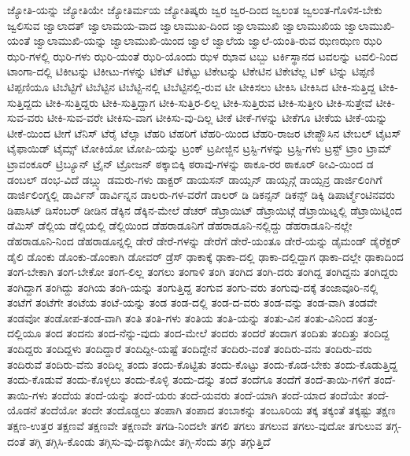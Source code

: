 {ಜ್ಯೋತಿ-ಯನ್ನು
ಜ್ಯೋತಿಯೇ
ಜ್ಯೋತಿರ್ಮಯ
ಜ್ಯೋತಿಷ್ಕರು
ಜ್ವರ
ಜ್ವರ-ದಿಂದ
ಜ್ವಲಂತ
ಜ್ವಲಂತ-ಗೊಳಿಸ-ಬೇಕು
ಜ್ವಲಿಸುವ
ಜ್ವಾಲಾದತ್
ಜ್ವಾಲಾಮಯ-ವಾದ
ಜ್ವಾಲಾಮುಖ-ದಿಂದ
ಜ್ವಾಲಾಮುಖಿ
ಜ್ವಾಲಾಮುಖಿಯ
ಜ್ವಾಲಾಮುಖಿ-ಯಂತೆ
ಜ್ವಾಲಾಮುಖಿ-ಯನ್ನು
ಜ್ವಾಲಾಮುಖಿ-ಯಿಂದ
ಜ್ವಾಲೆ
ಜ್ವಾಲೆಯ
ಜ್ವಾಲೆ-ಯಂತಿ-ರುವ
ಝಣಝಣ
ಝರಿ
ಝರಿ-ಗಳಲ್ಲಿ
ಝರಿ-ಗಳು
ಝರಿ-ಯಂತೆ
ಝರಿ-ಯೊಂದು
ಝಳ
ಝಾವ
ಟಬ್ಬು
ಟರ್ಕಿಸ್ಥಾನದ
ಟವಲನ್ನು
ಟವಲಿ-ನಿಂದ
ಟಾಂಗಾ-ದಲ್ಲಿ
ಟಿಕೀಟನ್ನು
ಟಿಕೀಟು-ಗಳನ್ನು
ಟಿಕೆಟ್
ಟಿಕೆಟ್ಟು
ಟಿಕೇಟನ್ನು
ಟಿಕೇಟಿನ
ಟಿಕೇಟೆಲ್ಲ
ಟಿಕ್
ಟಿನ್ನು
ಟಿಪ್ಪಣಿ
ಟಿಪ್ಪಣಿಯೂ
ಟಿಬೆಟ್ಟಿಗೆ
ಟಿಬೆಟ್ಟಿನ
ಟಿಬೆಟ್ಟಿ-ನಲ್ಲಿ
ಟಿಬೆಟ್ಟಿನಲ್ಲಿ-ರುವ
ಟೀ
ಟೀಕಿಸಲು
ಟೀಕಿಸಿ
ಟೀಕಿಸಿದ
ಟೀಕಿ-ಸುತ್ತಿದ್ದ
ಟೀಕಿ-ಸುತ್ತಿದ್ದದು
ಟೀಕಿ-ಸುತ್ತಿದ್ದರು
ಟೀಕಿ-ಸುತ್ತಿದ್ದಾಗ
ಟೀಕಿ-ಸುತ್ತಿರ-ಲಿಲ್ಲ
ಟೀಕಿ-ಸುತ್ತಿರುವ
ಟೀಕಿ-ಸುತ್ತೀರಿ
ಟೀಕಿ-ಸುತ್ತೇವೆ
ಟೀಕಿ-ಸುವ-ವರು
ಟೀಕಿ-ಸುವ-ವರೇ
ಟೀಕಿಸು-ವಾಗ
ಟೀಕಿಸು-ವು-ದಿಲ್ಲ
ಟೀಕೆ
ಟೀಕೆ-ಗಳನ್ನು
ಟೀಕೆಗೂ
ಟೀಕೆಯ
ಟೀಕೆ-ಯನ್ನು
ಟೀಕೆ-ಯಿಂದ
ಟೀಗೆ
ಟೆನಿಸ್
ಟೆರೈ
ಟೆಲ್ಸಾ
ಟೆಹರಿ
ಟೆಹರಿಗೆ
ಟೆಹರಿ-ಯಿಂದ
ಟೆಹರಿ-ರಾಜರ
ಟೇಪ್ಹೌಸಿನ
ಟೇಬಲ್
ಟೈಟಸ್
ಟೈಫಾಯಿಡ್
ಟೈಮ್ಸ್
ಟೋಕಿಯೋ
ಟೋಪಿ-ಯನ್ನು
ಟ್ರಂಕ್
ಟ್ರಪೀಜ್ಜಿನ
ಟ್ರಸ್ಟಿ-ಗಳನ್ನು
ಟ್ರಸ್ಟಿ-ಗಳು
ಟ್ರಸ್ಟ್
ಟ್ರಾಂ
ಟ್ರಾಮ್
ಟ್ರಾವಂಕೂರ್
ಟ್ರಿಬ್ಯೂನ್
ಟ್ರೈನ್
ಟ್ರೋಜನ್
ಠಕ್ಕಾಬಿಕ್ಕಿ
ಠರಾವು-ಗಳನ್ನು
ಠಾಕೂ-ರರ
ಠಾಕೂರ್
ಠೀವಿ-ಯಿಂದ
ಡ
ಡಂಬಲ್
ಡಂಭ-ವಿದೆ
ಡಬ್ಲ್ಯು
ಡಮರು-ಗಳು
ಡಾಕ್ಟರ್
ಡಾಯಸನ್
ಡಾಯ್ಸನ್
ಡಾಯ್ಸನ್ಗೆ
ಡಾಯ್ಸನ್ರ
ಡಾರ್ಜಿಲಿಂಗಿಗೆ
ಡಾರ್ಜಿಲಿಂಗ್ನಲ್ಲಿ
ಡಾರ್ವಿನ್
ಡಾರ್ವಿನ್ನನ
ಡಾಲರು-ಗಳ-ವರೆಗೆ
ಡಾಲರ್
ಡಿ
ಡಿಕನ್ಸನ್
ಡಿಕನ್ಸ್
ಡಿಕ್ಕಿ
ಡಿಪಾರ್ಟ್ಮೆಂಟಿನವರು
ಡಿಪಾಸಿಟ್
ಡಿಸೆಂಬರ್
ಡೀಡಿನ
ಡೆಕ್ಕಿನ
ಡೆಕ್ಕಿನ-ಮೇಲೆ
ಡೆಚರ್
ಡೆಟ್ರಾಯಿಟ್
ಡೆಟ್ರಾಯಿಟ್ಗೆ
ಡೆಟ್ರಾಯಿಟ್ನಲ್ಲಿ
ಡೆಟ್ರಾಯಿಟ್ನಿಂದ
ಡೆಮಿಸ್
ಡೆಲ್ಲಿಯ
ಡೆಲ್ಲಿಯಲ್ಲಿ
ಡೆಲ್ಲಿಯಿಂದ
ಡೆಹರಾಡೂನಿಗೆ
ಡೆಹರಾಡೂನಿ-ನಲ್ಲಿದ್ದು
ಡೆಹರಾಡೂನಿ-ನಲ್ಲೇ
ಡೆಹರಾಡೂನಿ-ನಿಂದ
ಡೆಹರಾಡೂನ್ನಲ್ಲಿ
ಡೇರೆ
ಡೇರೆ-ಗಳನ್ನು
ಡೇರೆಗೆ
ಡೇರೆ-ಯಂತೂ
ಡೇರೆ-ಯನ್ನು
ಡೈಮಂಡ್
ಡೈರೆಕ್ಟರ್
ಡೈಲಿ
ಡೊಂಕು
ಡೊಂಕು-ಡೊಂಕಾಗಿ
ಡೋವರ್
ಡ್ರೆಸ್
ಢಾಕಾಕ್ಕೆ
ಢಾಕಾ-ದಲ್ಲಿ
ಢಾಕಾ-ದಲ್ಲಿದ್ದಾಗ
ಢಾಕಾ-ದಲ್ಲೇ
ಢಾಕಾದಿಂದ
ತಂಗ-ಬೇಕಾಗಿ
ತಂಗ-ಬೇಕೋ
ತಂಗ-ಲಿಲ್ಲ
ತಂಗಲು
ತಂಗಾಳಿ
ತಂಗಿ
ತಂಗಿದ
ತಂಗಿ-ದರು
ತಂಗಿದ್ದ
ತಂಗಿದ್ದನು
ತಂಗಿದ್ದರು
ತಂಗಿದ್ದಾಗ
ತಂಗಿದ್ದು
ತಂಗಿಯ
ತಂಗಿ-ಯನ್ನು
ತಂಗುತ್ತಿದ್ದ
ತಂಗುವ
ತಂಗು-ವರು
ತಂಗುವು-ದಕ್ಕೆ
ತಂಜಾವೂರಿ-ನಲ್ಲಿ
ತಂಟೆಗೆ
ತಂಟೆಗೇ
ತಂಟೆಯ
ತಂಟೆ-ಯನ್ನು
ತಂಡ
ತಂಡ-ದಲ್ಲಿ
ತಂಡ-ದ-ವರು
ತಂಡ-ವನ್ನು
ತಂಡ-ವಾಗಿ
ತಂಡವೇ
ತಂಡವೋ
ತಂಡೋಪ-ತಂಡ-ವಾಗಿ
ತಂತಿ
ತಂತಿ-ಗಳು
ತಂತಿಯ
ತಂತಿ-ಯನ್ನು
ತಂತು-ವಿನ
ತಂತು-ವಿನಿಂದ
ತಂತ್ರ-ದಲ್ಲಿಯೂ
ತಂದ
ತಂದನು
ತಂದ-ನೆನ್ನು-ವುದು
ತಂದ-ಮೇಲೆ
ತಂದರು
ತಂದರೆ
ತಂದಾಗ
ತಂದಿತು
ತಂದಿತ್ತು
ತಂದಿದ್ದ
ತಂದಿದ್ದರು
ತಂದಿದ್ದಳು
ತಂದಿದ್ದಾರೆ
ತಂದಿದ್ದೀ-ಯಷ್ಟೆ
ತಂದಿದ್ದೇನೆ
ತಂದಿರು-ವಂತೆ
ತಂದಿರು-ವನು
ತಂದಿರು-ವರು
ತಂದಿರುವೆ
ತಂದಿರು-ವೆನು
ತಂದಿಲ್ಲ
ತಂದು
ತಂದು-ಕೊಟ್ಟಿತು
ತಂದು-ಕೊಟ್ಟು
ತಂದು-ಕೊಡ-ಬೇಕು
ತಂದು-ಕೊಡುತ್ತಿದ್ದ
ತಂದು-ಕೊಡುವೆ
ತಂದು-ಕೊಳ್ಳಲು
ತಂದು-ಕೊಳ್ಳಿ
ತಂದು-ದನ್ನು
ತಂದೆ
ತಂದೆಗೂ
ತಂದೆಗೆ
ತಂದೆ-ತಾಯಿ-ಗಳಿಗೆ
ತಂದೆ-ತಾಯಿ-ಗಳು
ತಂದೆಯ
ತಂದೆ-ಯನ್ನು
ತಂದೆ-ಯರು
ತಂದೆ-ಯವರು
ತಂದೆ-ಯಾಗಿ
ತಂದೆ-ಯಾದ
ತಂದೆಯೇ
ತಂದೆ-ಯೊಡನೆ
ತಂದೆಯೋ
ತಂದೇ
ತಂದೊಡ್ಡಲು
ತಂಪಾಗಿ
ತಂಪಾದ
ತಂಬಾಕನ್ನು
ತಂಬೂರಿಯ
ತಕ್ಕ
ತಕ್ಕಂತೆ
ತಕ್ಕಷ್ಟು
ತಕ್ಷಣ
ತಕ್ಷಣ-ಉತ್ತರ
ತಕ್ಷಣವೆ
ತಕ್ಷಣವೇ
ತಕ್ಷಣವೇ
ತಗಡಿ-ನಿಂದಲೇ
ತಗಲಿ
ತಗಲು
ತಗಲುವ
ತಗಲು-ವುದೋ
ತಗುಲುವ
ತಗ್ಗ-ದಂತೆ
ತಗ್ಗಿ
ತಗ್ಗಿಸಿ-ಕೊಂಡು
ತಗ್ಗಿಸು-ವು-ದಕ್ಕಾಗಿಯೇ
ತಗ್ಗಿ-ಸೆಂದು
ತಗ್ಗು
ತಗ್ಗುತ್ತಿದೆ
}
